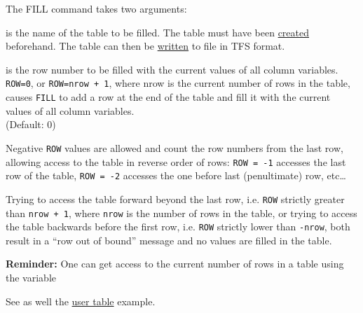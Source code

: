 The FILL command takes two arguments:
\begin{madlist}
   is the name of the table to be filled. The table must
  have been \hyperref[sec:create]{created} beforehand. 
  The table can then be \hyperref[sec:write]{written} to file in TFS
  format. 

   is the row number to be filled with the current values of
  all column variables. \\ 
  \texttt{ROW=0}, or \texttt{ROW=nrow + 1}, where nrow is the current
  number of rows in the table, causes \texttt{FILL} to add a row at
  the end of the table and fill it with the current values of all
  column variables. \\ (Default: 0) 
\end{madlist}

Negative \texttt{ROW} values are allowed and count the row numbers from
the last row, allowing access to the table in reverse order of rows:
\texttt{ROW~=~-1} accesses the last row of the table,
\texttt{ROW~=~-2} accesses the one before last (penultimate) row,
etc\ldots  


Trying to access the table forward beyond the last row, i.e. \texttt{ROW}
strictly greater than {\tt nrow + 1}, where {\tt nrow} is the number of
rows in the table, or trying to access the table backwards before the
first row, i.e. \texttt{ROW} strictly lower than {\tt -nrow}, both
result in a ``row out of bound'' message and no values are filled in the
table. 


{\bf Reminder:} One can get access to the current number of rows in a
table using the variable 

See as well the \href{../Introduction/select.html#ucreate}{user table}
example.   



